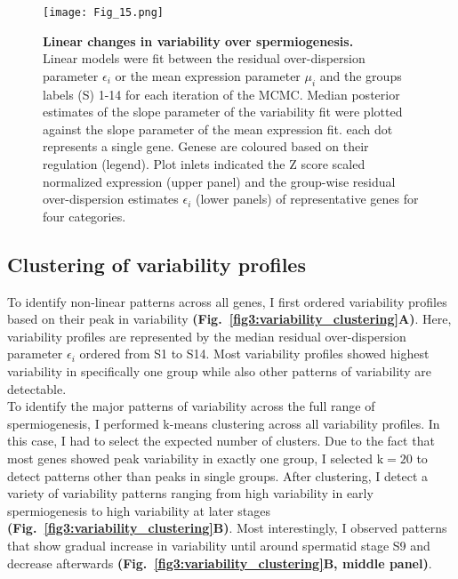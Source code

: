 \newpage

\begin{figure}[!h]
\centering
\texttt{[image: Fig\_15.png]}
\caption[Linear changes in variability over spermiogenesis]{\textbf{Linear changes in variability over spermiogenesis.}\\
Linear models were fit between the residual over-dispersion parameter $\epsilon_i$ or the mean expression parameter $\mu_i$ and the groups labels (S) 1-14 for each iteration of the MCMC. Median posterior estimates of the slope parameter of the variability fit were plotted against the slope parameter of the mean expression fit. each dot represents a single gene. Genese are coloured based on their regulation (legend). Plot inlets indicated the Z score scaled normalized expression (upper panel) and the group-wise residual over-dispersion estimates $\epsilon_i$ (lower panels) of representative genes for four categories.}
\label{fig3:linear_variability}
\end{figure}

\newpage

\subsection{Clustering of variability profiles}

To identify non-linear patterns across all genes, I first ordered variability profiles based on their peak in variability \textbf{(Fig.~\ref{fig3:variability_clustering}A)}. Here, variability profiles are represented by the median residual over-dispersion parameter $\epsilon_i$  ordered from S1 to S14. Most variability profiles showed highest variability in specifically one group while also other patterns of variability are detectable. \\

To identify the major patterns of variability across the full range of spermiogenesis, I performed k-means clustering across all variability profiles. In this case, I had to select the expected number of clusters. Due to the fact that most genes showed peak variability in exactly one group, I selected $\text{k}=20$ to detect patterns other than peaks in single groups. After clustering, I detect a variety of variability patterns ranging from high variability in early spermiogenesis to high variability at later stages \textbf{(Fig.~\ref{fig3:variability_clustering}B)}. Most interestingly, I observed patterns that show gradual increase in variability until around spermatid stage S9 and decrease afterwards \textbf{(Fig.~\ref{fig3:variability_clustering}B, middle panel)}. \\

